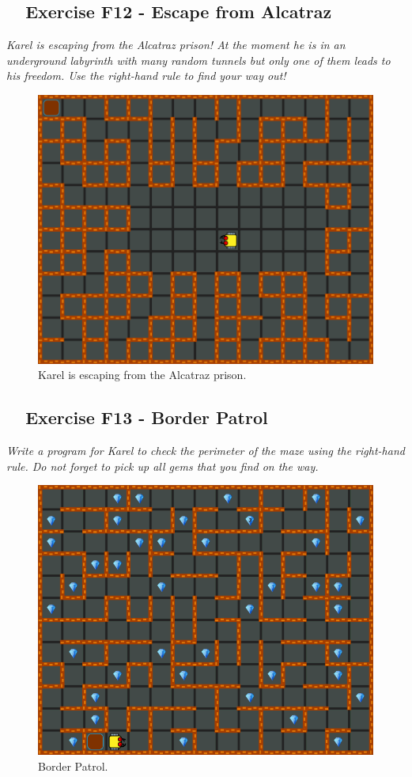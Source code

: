 \documentclass[article,A4,12pt]{llncs}
\begin{document}
{{{{\subsection{\ \ Exercise F12 - Escape from Alcatraz}

{\em Karel is escaping from the Alcatraz prison! At the moment he is in an underground labyrinth with many random tunnels but only one of them leads to his freedom. Use the right-hand rule to find your way out!}\\[-7mm]


\begin{figure}[!ht]
\begin{center}
\includegraphics[height=0.4\textwidth]{img/f12.png}
\end{center}
\vspace{-4mm}
\caption{Karel is escaping from the Alcatraz prison.}
\label{fig:f12}
\vspace{-10mm}
\end{figure}
\noindent
\newpage

\subsection{\ \ Exercise F13 - Border Patrol}

{\em Write a program for Karel to check the perimeter of the maze using the 
right-hand rule. Do not forget to pick up all gems that you find on the way.}\\[-7mm]

\begin{figure}[!ht]
\begin{center}
\includegraphics[height=0.4\textwidth]{img/f13.png}
\end{center}
\vspace{-4mm}
\caption{Border Patrol.}
\label{fig:f13}
\vspace{-12mm}
\end{figure}
\noindent

}}}}
\end{document}
